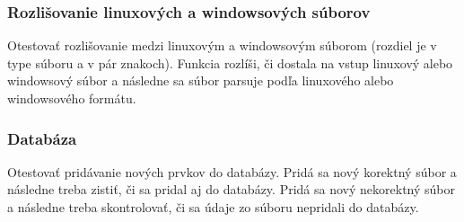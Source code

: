 \documentclass[12pt,a4paper]{article}
\begin{document}
\subsubsection{Rozlišovanie linuxových a windowsových súborov}
Otestovať rozlišovanie medzi linuxovým a windowsovým súborom (rozdiel je v type súboru a v pár znakoch). Funkcia rozlíši, či dostala na vstup linuxový alebo windowsový súbor a následne sa súbor parsuje podľa linuxového alebo windowsového formátu.  

\subsubsection{Databáza}
Otestovať pridávanie nových prvkov do databázy. Pridá sa nový korektný súbor a následne treba zistiť, či sa pridal aj do databázy. Pridá sa nový nekorektný súbor a následne treba skontrolovať, či sa údaje zo súboru nepridali do databázy.
\end{document}
